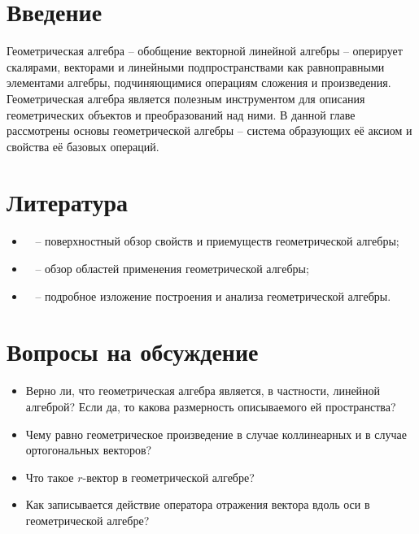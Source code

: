 \section{Введение}

Геометрическая алгебра -- обобщение векторной линейной алгебры -- оперирует скалярами, векторами и линейными подпространствами как равноправными элементами алгебры, подчиняющимися операциям сложения и произведения. Геометрическая алгебра является полезным инструментом для описания геометрических объектов и преобразований над ними. В данной главе рассмотрены основы геометрической алгебры -- система образующих её аксиом и свойства её базовых операций.

\section{Литература}

	\begin{itemize}
		\item ~\cite{Hestenes1985} --  поверхностный обзор свойств и приемуществ геометрической алгебры;
		\item ~\cite{Hitzer2013} -- обзор областей применения геометрической алгебры;
		\item ~\cite{Chisolm} -- подробное изложение построения и анализа геометрической алгебры.
	\end{itemize}
	
\section{Вопросы на обсуждение}

	\begin{itemize}
	\item Верно ли, что геометрическая алгебра является, в частности, линейной алгеброй? Если да, то какова размерность описываемого ей пространства?
	\item Чему равно геометрическое произведение в случае коллинеарных и в случае ортогональных векторов?
	\item Что такое $r$-вектор в геометрической алгебре?
	\item Как записывается действие оператора отражения вектора вдоль оси в геометрической алгебре?
\end{itemize}